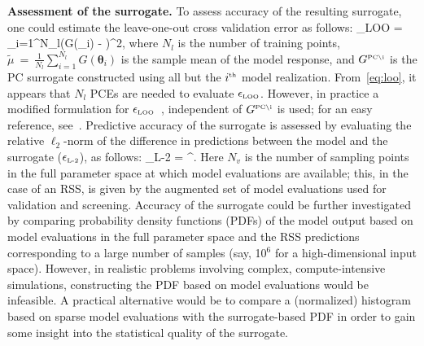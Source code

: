 \textbf{Assessment of the surrogate.}
To assess accuracy of the resulting surrogate, one could estimate the
leave-one-out cross validation error as follows:
\be
\epsilon_{\mbox{\tiny LOO}} = 
{\sum\limits_{i=1}^{N_l}\left(G(\bm{\theta}_i) - \widetilde{\mu}\right)^2},
\label{eq:loo}
\ee
where $N_l$ is the number of training points,
$\widetilde{\mu}~=~\frac{1}{N_l}\sum\limits_{i=1}^{N_l} G(\bm{\theta}_i)$ is
the sample mean of the model response, and $ G^{\mbox{\tiny {PC}\textbackslash
i}}$ is the PC surrogate constructed using all but the $i^{\mbox{\tiny{th}}}$
model realization.  From~\eqref{eq:loo}, it appears that $N_l$ PCEs are needed
to evaluate $\epsilon_{\mbox{\tiny LOO}}$.  However, in practice a modified
formulation for $\epsilon_{\mbox{\tiny LOO}}$~\cite{Blatman:2009}, independent
of $G^{\mbox{\tiny {PC}\textbackslash i}}$ is used; for an easy reference,
see~\cite[Eq.~(1.27)]{Marelli:2014}.  Predictive accuracy of the surrogate is 
assessed by evaluating the relative $\ell_2$-norm of the difference in
predictions between the model and the surrogate ($\epsilon_{\mbox{\tiny{L-2}}}$), as follows:
\be
\epsilon_{\mbox{\tiny{L-2}}} = 
{\left[\sum\limits_{i=1}^{N_v}\left(G(\bm{\theta}_i)\right)^2\right]^{}}.
\label{eq:l2}
\ee
Here $N_v$ is the number of sampling points in the full parameter space at
which model evaluations are available; this, in the case of an RSS, is 
given by the
augmented set of model evaluations used for validation and screening.  
%
Accuracy of the surrogate could be further investigated by comparing
probability density functions (PDFs) of the model output based on model
evaluations in the full parameter space and the RSS predictions corresponding
to a large number of samples (say, 10$^6$ for a high-dimensional input space).
However, in realistic problems
involving complex, compute-intensive simulations, constructing the PDF based on model
evaluations would be infeasible.  A practical alternative would be to compare
a (normalized) histogram based on sparse model evaluations with the surrogate-based PDF in
order to gain some insight into the statistical quality of the surrogate. 

